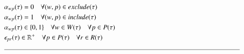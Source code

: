 \begin{alignat}{2}
	& \VarStrategicWorkOrderAssignment{\ElementWorkOrder}{\ElementPeriod} = 0                                                            \quad \forall (\ElementWorkOrder, \ElementPeriod) \in \ParStrategicExclude                                                                                                       \\
	& \VarStrategicWorkOrderAssignment{\ElementWorkOrder}{\ElementPeriod} = 1                                                            \quad \forall (\ElementWorkOrder, \ElementPeriod) \in \ParStrategicInclude                                                                                                       \\
	& \VarStrategicWorkOrderAssignment{\ElementWorkOrder}{\ElementPeriod} \in \{0, 1\}                                                   \quad \forall \ElementWorkOrder \in \SetWorkOrder{} \quad \forall \ElementPeriod \in \SetPeriod                                                                                 \\ 
	& \VarStrategicExcess \in \mathbb{R}^{+}                                                                                             \quad \forall \ElementPeriod \in \SetPeriod \quad \forall \ElementResource \in \SetResource                                                                                  \\ 
	& \text{\rule{\linewidth}{0.4pt}} \notag
\end{alignat}
\newpage

